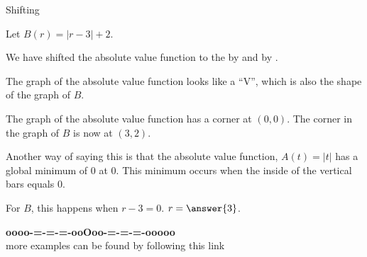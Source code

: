 \documentclass{ximera}
\begin{document}
\begin{example}  Shifting

Let $B(r) = |r-3| + 2$.  


We have shifted the absolute value function to the  by  and   by .


\begin{image}
\end{image}




The graph of the absolute value function looks like a ``V'', which is also the shape of the graph of $B$. 


The graph of the absolute value function has a corner at $(0, 0)$.  The corner in the graph of $B$ is now at $(3, 2)$. 

Another way of saying this is that the absolute value function, $A(t) = |t|$ has a global minimum of $0$ at $0$.  This minimum occurs when the inside of the vertical bars equals $0$.

For $B$, this happens when $r-3=0$. $r=\answer{3}$.



\end{example}



















\begin{center}
\textbf{\textcolor{green!50!black}{oooo-=-=-=-ooOoo-=-=-=-ooooo}} \\

more examples can be found by following this link\\ 

\end{center}
\end{document}
